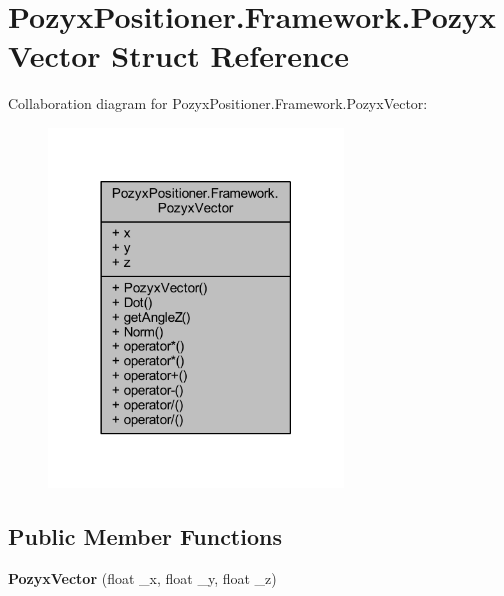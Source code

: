\hypertarget{struct_pozyx_positioner_1_1_framework_1_1_pozyx_vector}{}\section{Pozyx\+Positioner.\+Framework.\+Pozyx\+Vector Struct Reference}
\label{struct_pozyx_positioner_1_1_framework_1_1_pozyx_vector}


Collaboration diagram for Pozyx\+Positioner.\+Framework.\+Pozyx\+Vector\+:
\nopagebreak
\begin{figure}[H]
\begin{center}
\leavevmode
\includegraphics[width=222pt]{struct_pozyx_positioner_1_1_framework_1_1_pozyx_vector__coll__graph}
\end{center}
\end{figure}
\subsection*{Public Member Functions}
\begin{DoxyCompactItemize}
\item 
\mbox{\label{struct_pozyx_positioner_1_1_framework_1_1_pozyx_vector_aefc563d4720d301eaf6bd2cb62858c01}} 
{\bfseries Pozyx\+Vector} (float \+\_\+x, float \+\_\+y, float \+\_\+z)
\end{DoxyCompactItemize}
